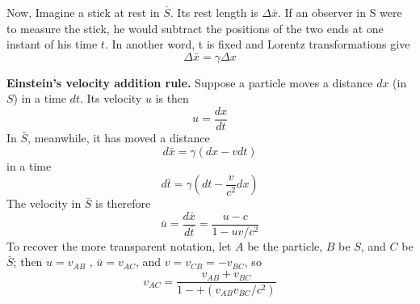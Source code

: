 \documentclass[../../../main.tex]{subfiles}
\begin{document}
Now, Imagine a stick at rest in $\bar{S}$. Its rest length is $\Delta \bar{x}$. If an observer in S were to measure the stick, he would subtract the positions of the two ends at one instant of his time $t$. In another word, t is fixed and Lorentz transformations give
\begin{equation*}
    \Delta \bar{x}=\gamma \Delta x
\end{equation*}

\textbf{Einstein's velocity addition rule.} Suppose a particle moves a distance $dx$ (in $S$) in a time $dt$. Its velocity $u$ is then
\begin{equation*}
    u=\frac{dx}{dt}
\end{equation*}
In $\bar{S}$, meanwhile, it has moved a distance
\begin{equation*}
    d\bar{x}=\gamma(dx-vdt)
\end{equation*}
in a time 
\begin{equation*}
    d\bar{t}=\gamma (dt-\frac{v}{c^2}dx)
\end{equation*}
The velocity in $\bar{S}$ is therefore
\begin{equation*}
    \bar{u}=\frac{d\bar{x}}{d\bar{t}}=\frac{u-c}{1-uv/c^2}
\end{equation*}
To recover the more transparent notation, let $A$ be the particle, $B$ be $S$, and $C$ be $\bar{S}$; then $u = v_{AB}$ , $\bar{u} = v_{AC}$, and $v = v_{C B} = -v_{BC}$, so 
\begin{equation*}
    v_{AC}=\frac{v_{AB}+v_{BC}}{1-+(v_{AB}v_{BC}/c^2)}
\end{equation*}
\end{document}
